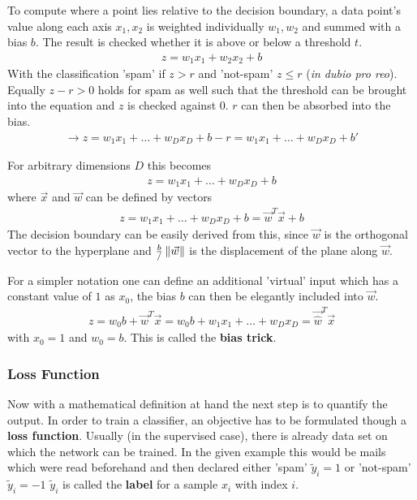 To compute where a point lies relative to the decision boundary, a data point's value along each axis $x_1, x_2$ is weighted individually $w_1, w_2$ and summed with a bias $b$.
The result is checked whether it is above or below a threshold $t$.
\begin{align}
    z = w_1 x_1 + w_2 x_2 + b
\end{align}
With the classification 'spam' if $z > r$ and 'not-spam' $z \leq r$ (\textit{in dubio pro reo}).
Equally $z - r > 0$ holds for spam as well such that the threshold can be brought into the equation and $z$ is checked against $0$.
$r$ can then be absorbed into the bias.
\begin{align}
    \rightarrow z = w_1 x_1 + \hdots + w_D x_D + b - r = w_1 x_1 + \hdots + w_D x_D + b'
\end{align}

For arbitrary dimensions $D$ this becomes
\begin{align}
    z = w_1 x_1 + \hdots + w_D x_D + b
\end{align}
 where $\vec{x}$ and $\vec{w}$ can be defined by vectors
\begin{align}
    z = w_1 x_1 + \hdots + w_D x_D + b = \vec{w}^T \vec{x} + b
\end{align}
The decision boundary can be easily derived from this, since $\vec{w}$ is the orthogonal vector to the hyperplane and $\frac{b}/\left\lVert\vec{w}\right\rVert$ is the displacement of the plane along $\vec{w}$.

For a simpler notation one can define an additional 'virtual' input which has a constant value of $1$ as $x_0$, the bias $b$ can then be elegantly included into $\vec{w}$.
\begin{align}
    z = w_0 b + \vec{w}^T \vec{x} = w_0 b + w_1 x_1 + \hdots + w_D x_D = \vec{\hat{w}}^T \vec{x}
\end{align}
with $x_0 = 1$ and $w_0 = b$.
This is called the \textbf{bias trick}.



\subsubsection{Loss Function}
Now with a mathematical definition at hand the next step is to quantify the output.
In order to train a classifier, an objective has to be formulated though a \textbf{loss function}.
Usually (in the supervised case), there is already data set on which the network can be trained.
In the given example this would be mails which were read beforehand and then declared either 'spam' $\tilde{y}_i = 1$ or 'not-spam' $\tilde{y}_i = -1$
$\tilde{y}_i$ is called the \textbf{label} for a sample $x_i$ with index $i$.

